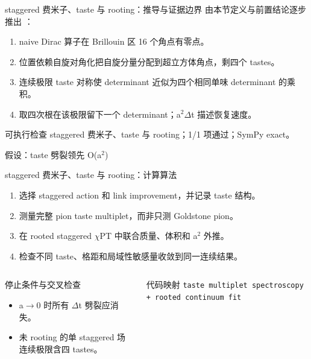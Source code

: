 \begin{frame}[t]{staggered 费米子、taste 与 rooting：推导与证据边界}
\footnotesize
{}\quad 由本节定义与前置结论逐步推出 ：
\begin{enumerate}
\item naive Dirac 算子在 Brillouin 区 16 个角点有零点。
\item 位置依赖自旋对角化把自旋分量分配到超立方体角点，剩四个 tastes。
\item 连续极限 taste 对称使 determinant 近似为四个相同单味 determinant 的乘积。
\item 取四次根在该极限留下一个 determinant；a\ensuremath{^{2}}\ensuremath{\Delta}t 描述恢复速度。
\end{enumerate}\begin{block}{可执行检查}
\quad staggered 费米子、taste 与 rooting；1/1 项通过；SymPy exact。
\par\scriptsize 假设：taste 劈裂领先 O(a\ensuremath{^{2}})
\end{block}
\end{frame}

\begin{frame}[t]{staggered 费米子、taste 与 rooting：计算算法}
\footnotesize
{}\begin{enumerate}
\item 选择 staggered action 和 link improvement，并记录 taste 结构。
\item 测量完整 pion taste multiplet，而非只测 Goldstone pion。
\item 在 rooted staggered \ensuremath{\chi}PT 中联合质量、体积和 a\ensuremath{^{2}} 外推。
\item 检查不同 taste、格距和局域性敏感量收敛到同一连续结果。
\end{enumerate}\begin{columns}[T,onlytextwidth]
\begin{block}{停止条件与交叉检查}\scriptsize\begin{itemize}
\item[\CheckMark] a\ensuremath{\rightarrow}0 时所有 \ensuremath{\Delta}t 劈裂应消失。
\item[\CheckMark] 未 rooting 的单 staggered 场连续极限含四 tastes。
\end{itemize}\end{block}
\begin{block}{代码映射}
\scriptsize \texttt{taste multiplet spectroscopy + rooted continuum fit}
\end{block}\end{columns}\end{frame}

